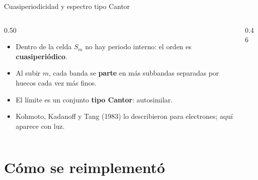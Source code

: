 \documentclass[aspectratio=169,10pt]{beamer}
\begin{document}
\begin{frame}{Cuasiperiodicidad y espectro tipo Cantor}
  \begin{columns}[c]
    \begin{column}{0.50\textwidth}
      \begin{itemize}
        \item Dentro de la celda $S_m$ no hay periodo interno: el orden es \textbf{cuasiperiódico}.
        \item Al subir $m$, cada banda se \textbf{parte} en más subbandas separadas por huecos cada vez más finos.
        \item El límite es un conjunto \textbf{tipo Cantor}: autosimilar.
        \item Kohmoto, Kadanoff y Tang (1983) lo describieron para electrones; aquí aparece con luz.
      \end{itemize}
    \end{column}
    \begin{column}{0.46\textwidth}
      \centering
    \end{column}
  \end{columns}
\end{frame}

\section{Cómo se reimplementó}
\end{document}
